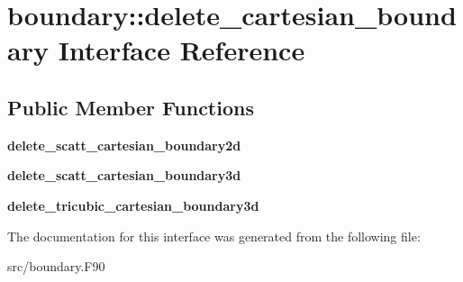\hypertarget{interfaceboundary_1_1delete__cartesian__boundary}{}\section{boundary\+:\+:delete\+\_\+cartesian\+\_\+boundary Interface Reference}
\label{interfaceboundary_1_1delete__cartesian__boundary}
\subsection*{Public Member Functions}
\begin{DoxyCompactItemize}
\item 
\mbox{\label{interfaceboundary_1_1delete__cartesian__boundary_a1a14bea5c2fe55ede5a1fc63f2f09b49}} 
{\bfseries delete\+\_\+scatt\+\_\+cartesian\+\_\+boundary2d}
\item 
\mbox{\label{interfaceboundary_1_1delete__cartesian__boundary_a08fb57a2f577432baccf1996a079595b}} 
{\bfseries delete\+\_\+scatt\+\_\+cartesian\+\_\+boundary3d}
\item 
\mbox{\label{interfaceboundary_1_1delete__cartesian__boundary_a85b9c21545ee205fc99402635b61bbeb}} 
{\bfseries delete\+\_\+tricubic\+\_\+cartesian\+\_\+boundary3d}
\end{DoxyCompactItemize}


The documentation for this interface was generated from the following file\+:\begin{DoxyCompactItemize}
\item 
src/boundary.\+F90\end{DoxyCompactItemize}
